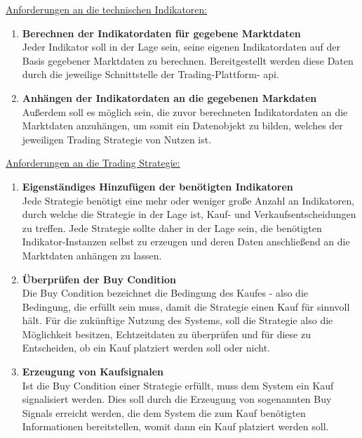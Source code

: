 \documentclass[oneside]{ausarbeitung}
\begin{document}
\underline{Anforderungen an die technischen Indikatoren:}
\begin{enumerate}
	\item \textbf{Berechnen der Indikatordaten für gegebene Marktdaten} \\
		Jeder Indikator soll in der Lage sein, seine eigenen Indikatordaten
		auf der Basis gegebener Marktdaten zu berechnen. Bereitgestellt werden
		diese Daten durch die jeweilige Schnittstelle der Trading-Plattform-
		\ac{api}. 
	\item \textbf{Anhängen der Indikatordaten an die gegebenen Markdaten} \\
		Außerdem soll es möglich sein, die zuvor berechneten Indikatordaten an
		die Marktdaten anzuhängen, um somit ein Datenobjekt zu bilden, welches
		der jeweiligen Trading Strategie von Nutzen ist. \\
\end{enumerate}

\underline{Anforderungen an die Trading Strategie:}
\begin{enumerate}
	\item \textbf{Eigenständiges Hinzufügen der benötigten Indikatoren} \\
		Jede Strategie benötigt eine mehr oder weniger große Anzahl an
		Indikatoren, durch welche die Strategie in der Lage ist, Kauf- und
		Verkaufsentscheidungen zu treffen. Jede Strategie sollte daher in der
		Lage sein, die benötigten Indikator-Instanzen selbst zu erzeugen und
		deren Daten anschließend an die Marktdaten anhängen zu lassen.
	\item \textbf{Überprüfen der Buy Condition} \\
		Die Buy Condition bezeichnet die Bedingung des Kaufes - also die
		Bedingung, die erfüllt sein muss, damit die Strategie einen Kauf für
		sinnvoll hält. Für die zukünftige Nutzung des Systems, soll die 
		Strategie also die Möglichkeit besitzen, Echtzeitdaten zu überprüfen 
		und für diese zu Entscheiden, ob ein Kauf platziert werden soll oder 
		nicht.
	\item \textbf{Erzeugung von Kaufsignalen} \\
		Ist die Buy Condition einer Strategie erfüllt, muss dem System ein Kauf
		signalisiert werden. Dies soll durch die Erzeugung von sogenannten Buy
		Signals erreicht werden, die dem System die zum Kauf benötigten 
		Informationen bereitstellen, womit dann ein Kauf platziert werden soll.
\end{enumerate}

\end{document}
